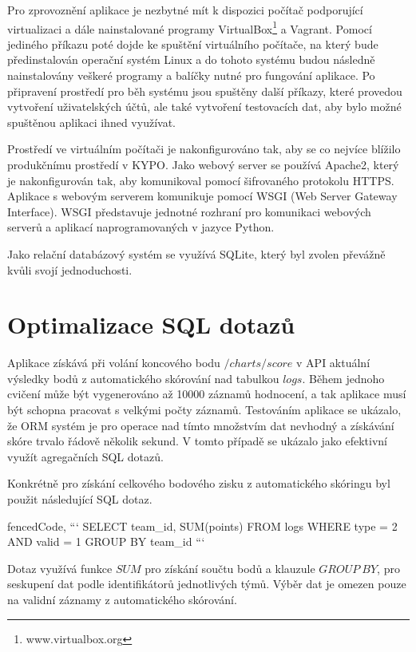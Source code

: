 \documentclass[
  digital, %
  twoside, %
  table,   %
  lof,     %
  lot,     %
]{fithesis3}
\begin{document}
Pro zprovoznění aplikace je nezbytné mít k dispozici počítač podporující virtualizaci a dále nainstalované programy VirtualBox\footnote{www.virtualbox.org} a Vagrant. Pomocí jediného příkazu poté dojde ke spuštění virtuálního počítače, na který bude předinstalován operační systém Linux a do tohoto systému budou následně nainstalovány veškeré programy a balíčky nutné pro fungování aplikace. Po připravení prostředí pro běh systému jsou spuštěny další příkazy, které provedou vytvoření uživatelských účtů, ale také vytvoření testovacích dat, aby bylo možné spuštěnou aplikaci ihned využívat. 

Prostředí ve virtuálním počítači je nakonfigurováno tak, aby se co nejvíce blížilo produkčnímu prostředí v KYPO. Jako webový server se používá Apache2, který je nakonfigurován tak, aby komunikoval pomocí šifrovaného protokolu HTTPS. Aplikace s webovým serverem komunikuje pomocí WSGI (Web Server Gateway Interface). WSGI představuje jednotné rozhraní pro komunikaci webových serverů a aplikací naprogramovaných v jazyce Python.

Jako relační databázový systém se využívá SQLite, který byl zvolen převážně kvůli svojí jednoduchosti.

\section{Optimalizace SQL dotazů}

Aplikace získává při volání koncového bodu $/charts/score$ v API aktuální výsledky bodů z automatického skórování nad tabulkou $logs$. Během jednoho cvičení může být vygenerováno až 10000 záznamů hodnocení, a tak aplikace musí být schopna pracovat s velkými počty záznamů. Testováním aplikace se ukázalo, že ORM systém je pro operace nad tímto množstvím dat nevhodný a získávání skóre trvalo řádově několik sekund. V tomto případě se ukázalo jako efektivní využít agregačních SQL dotazů. 

Konkrétně pro získání celkového bodového zisku z automatického skóringu byl použit následující SQL dotaz.

\begin{markdown*}{%
  fencedCode,
}
```
SELECT team_id, SUM(points) FROM logs 
WHERE type = 2 AND valid = 1 
GROUP BY team_id
```
\end{markdown*}

Dotaz využívá funkce $SUM$ pro získání součtu bodů a klauzule $GROUP\ BY$, pro seskupení dat podle identifikátorů jednotlivých týmů. Výběr dat je omezen pouze na validní záznamy z automatického skórování.
\end{document}
